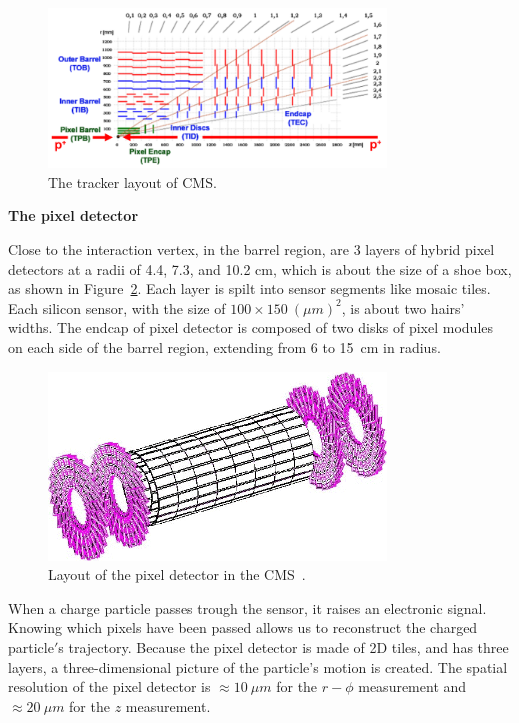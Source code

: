 \begin{figure}[!htbp]
\centering
\includegraphics[width=0.8\textwidth]{figures/TrackerLayout.png}
\caption{The tracker layout of CMS.}
\label{fig:trackerLayout}
\end{figure}

{\bf The pixel detector}

Close to the interaction vertex, in the barrel region, are 3 layers of hybrid pixel detectors at a radii of 4.4, 7.3, and 10.2 cm, which is about the size of a shoe box, as shown in Figure~\ref{fig:pixel}. 
Each layer is spilt into sensor segments like mosaic tiles. Each silicon sensor, with the size of $100 \times 150~(\mu m)^2$, is about two hairs' widths.
The endcap of pixel detector is composed of two disks of pixel modules on each side of the barrel region, extending from 6 to 15~cm in radius. 

\begin{figure}[!htbp]
\centering
\includegraphics[width=0.8\textwidth]{figures/pixel.png}
\caption{Layout of the pixel detector in the CMS~\cite{expBook}.}
\label{fig:pixel}
\end{figure}

When a charge particle passes trough the sensor, 
it raises an electronic signal. 
Knowing which pixels have been passed allows us to reconstruct the charged particle$'$s trajectory. 
Because the pixel detector is made of 2D tiles,  and has three layers,  a three-dimensional picture of the particle's motion is created.
The spatial resolution of the pixel detector is ${\approx}10~ \mu m$ for the $r{-}\phi$ measurement and
${\approx}20~\mu m$ for the $z$ measurement. 





